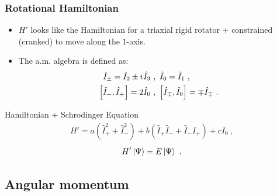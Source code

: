 \documentclass{beamer}
\newcommand{\iu}{{i\mkern1mu}}
\begin{document}
\begin{frame}
  \frametitle{Rotational Hamiltonian}
  \begin{itemize}
    \item $H'$ looks like the Hamiltonian for a triaxial rigid rotator + constrained (cranked) to move along the $1$-axis.
    \item The a.m. algebra is defined as:
    \begin{align}
      \hat{I}_\pm=\hat{I}_2\pm \iu\hat{I}_3\ &,\ \hat{I}_0=\hat{I}_1\ ,\\
      \left[\hat{I}_-,\hat{I}_+\right]=2\hat{I}_0\ &,\ \left[\hat{I}_\mp,\hat{I}_0\right]=\mp\hat{I}_\mp\ .
    \end{align}
  \end{itemize}
\begin{block}{Hamiltonian + Schrodinger Equation}
  \begin{align}
    H'=a\left(\hat{I}_+^2+\hat{I}_-^2\right)+b\left(\hat{I}_+\hat{I}_-+\hat{I}_-\hat{I}_+\right)+c\hat{I}_0\ ,
  \end{align}
  \begin{align}    
    H'\ket{\Psi}=E\ket{\Psi}\ .
  \end{align}
\end{block}
\end{frame}

\subsection{Angular momentum}
\end{document}
